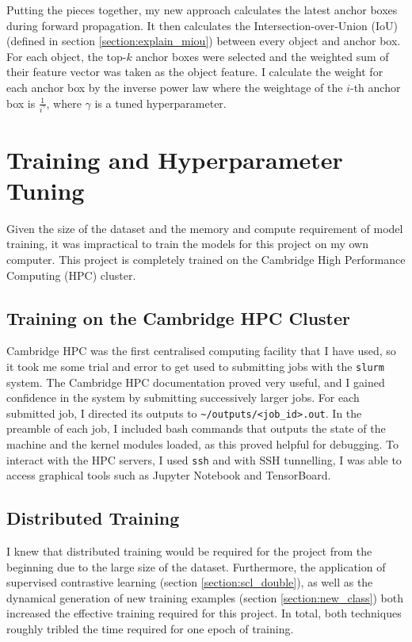 \documentclass[12pt,a4paper,twoside,openany]{report}
\begin{document}
Putting the pieces together, my new approach calculates the latest anchor boxes during forward propagation. It then calculates the Intersection-over-Union (IoU) (defined in section \ref{section:explain_miou}) between every object and anchor box. For each object, the top-$k$ anchor boxes were selected and the weighted sum of their feature vector was taken as the object feature. I calculate the weight for each anchor box by the inverse power law where the weightage of the $i$-th anchor box is $\frac{1}{i^{\gamma}}$, where $\gamma$ is a tuned hyperparameter.


\section{Training and Hyperparameter Tuning}
Given the size of the dataset and the memory and compute requirement of model training, it was impractical to train the models for this project on my own computer. This project is completely trained on the Cambridge High Performance Computing (HPC) cluster.

\subsection{Training on the Cambridge HPC Cluster}
Cambridge HPC was the first centralised computing facility that I have used, so it took me some trial and error to get used to submitting jobs with the \verb|slurm| system. The Cambridge HPC documentation proved very useful, and I gained confidence in the system by submitting successively larger jobs. For each submitted job, I directed its outputs to \verb|~/outputs/<job_id>.out|. In the preamble of each job, I included bash commands that outputs the state of the machine and the kernel modules loaded, as this proved helpful for debugging. To interact with the HPC servers, I used \verb|ssh| and with SSH tunnelling, I was able to access graphical tools such as Jupyter Notebook and TensorBoard.

\subsection{Distributed Training}
I knew that distributed training would be required for the project from the beginning due to the large size of the dataset. Furthermore, the application of supervised contrastive learning (section \ref{section:scl_double}), as well as the dynamical generation of new training examples (section \ref{section:new_class}) both  increased the effective training required for this project. In total, both techniques roughly tribled the time required for one epoch of training. 
\end{document}
